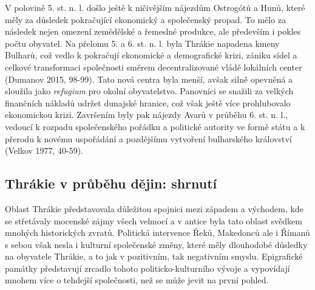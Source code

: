 V polovině 5. st. n. l. došlo ještě k ničivějším nájezdům Ostrogótů a Hunů, které měly za důsledek pokračující ekonomický a společenský propad. To mělo za následek nejen omezení zemědělské a řemeslné produkce, ale především i pokles počtu obyvatel. Na přelomu 5. a 6. st. n. l. byla Thrákie napadena kmeny Bulharů, což vedlo k pokračují ekonomické a demografické krizi, zániku sídel a celkové transformaci společnosti směrem decentralizované vládě lokálních center (Dumanov 2015, 98-99). Tato nová centra byla menší, avšak silně opevněná a sloužila jako {\em refugium} pro okolní obyvatelstvo. Panovníci se snažili za velkých finančních nákladů udržet dunajské hranice, což však ještě více prohlubovalo ekonomickou krizi. Završením byly pak nájezdy Avarů v průběhu 6. st. n. l., vedoucí k rozpadu společenského pořádku a politické autority ve formě státu a k přerodu k novému uspořádání a pozdějšímu vytvoření bulharského království (Velkov 1977, 40-59).

\subsection[thrákie-v-průběhu-dějin-shrnutí]{Thrákie v průběhu dějin: shrnutí}

Oblast Thrákie představovala důležitou spojnici mezi západem a východem, kde se střetávaly mocenské zájmy všech velmocí a v antice byla tato oblast svědkem mnohých historických zvratů. Politická intervence Řeků, Makedonců ale i Římanů s sebou však nesla i kulturní společenské změny, které měly dlouhodobé důsledky na obyvatele Thrákie, a to jak v pozitivním, tak negativním smyslu. Epigrafické památky představují zrcadlo tohoto politicko-kulturního vývoje a vypovídají mnohem více o tehdejší společnosti, než se může jevit na první pohled.


